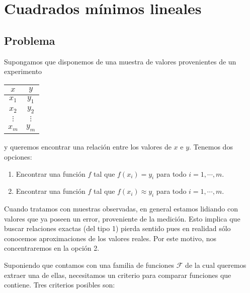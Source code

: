 \section{Cuadrados mínimos lineales}

\subsection{Problema}

Supongamos que disponemos de una muestra de valores provenientes de un experimento

\begin{center}
\begin{tabular}{c|c}
$x$ & $y$\\
\hline
$x_1$ & $y_1$\\
$x_2$ & $y_2$\\
$\vdots$ & $\vdots$\\
$x_m$ & $y_m$
\end{tabular}
\end{center}

y queremos encontrar una relación entre los valores de $x$ e $y$. Tenemos dos opciones:

\begin{enumerate}
\item Encontrar una función $f$ tal que $f(x_i) = y_i$ para todo $i = 1, \cdots, m$.
\item Encontrar una función $f$ tal que $f(x_i) \approx y_i$ para todo $i = 1, \cdots, m$.
\end{enumerate}

Cuando tratamos con muestras observadas, en general estamos lidiando con valores que ya poseen un error, proveniente de la medición. Esto implica que buscar relaciones exactas (del tipo 1) pierda sentido pues en realidad sólo conocemos aproximaciones de los valores reales. Por este motivo, nos concentraremos en la opción 2.

Suponiendo que contamos con una familia de funciones $\mathcal{F}$ de la cual queremos extraer una de ellas, necesitamos un criterio para comparar funciones que contiene. Tres criterios posibles son:

